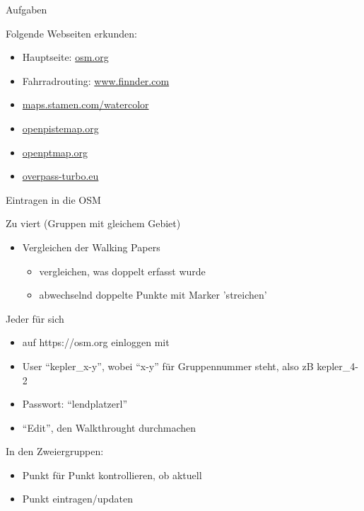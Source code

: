 \documentclass{beamer}
\begin{document}
\begin{frame}{Aufgaben}

  Folgende Webseiten erkunden:

  \begin{itemize}
    \item Hauptseite: \href{https://openstreetmap.org}{osm.org}
    \item Fahrradrouting: \href{http://www.finnder.com}{www.finnder.com}
    \item \href{http://maps.stamen.com/watercolor/}{maps.stamen.com/watercolor}
    \item \href{http://openpistemap.org}{openpistemap.org}
    \item \href{http://openptmap.org}{openptmap.org}
    \item \href{http://overpass-turbo.eu}{overpass-turbo.eu}
  \end{itemize}

\end{frame}

\begin{frame}{Eintragen in die OSM}

  Zu viert (Gruppen mit gleichem Gebiet)
  \begin{itemize}
  \item Vergleichen der Walking Papers
    \begin{itemize}
      \item vergleichen, was doppelt erfasst wurde
      \item abwechselnd doppelte Punkte mit Marker 'streichen'
    \end{itemize}
  \end{itemize}
  \pause
  Jeder für sich
  \begin{itemize}
    \item auf https://osm.org einloggen mit 
    \item User "`kepler\_x-y"', wobei "`x-y"' für Gruppennummer steht, also zB kepler\_4-2
    \item Passwort: "`lendplatzerl"'
    \item "`Edit"', den Walkthrought durchmachen
  \end{itemize}
  \pause
  In den Zweiergruppen:
  \begin{itemize}
    \item Punkt für Punkt kontrollieren, ob aktuell
    \item Punkt eintragen/updaten
  \end{itemize}

\end{frame}
\end{document}
